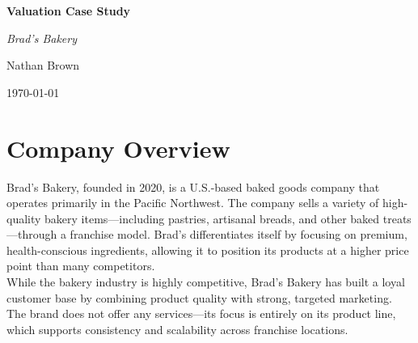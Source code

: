 \documentclass[11pt]{article}
\begin{document}
\begin{center}
    \vspace*{0.5cm}
    {\Huge\bfseries Valuation Case Study\par}
    \vspace{0.8cm}
    {\LARGE\itshape Brad's Bakery\par}
    \vspace{0.8cm}
    {\large Nathan Brown\par}
    {\large \today\par}
    \vspace{1cm}
\end{center}

\tableofcontents
\newpage

\section{Company Overview}
Brad’s Bakery, founded in 2020, is a U.S.-based baked goods company that operates primarily in the Pacific Northwest. The company sells a variety of high-quality bakery items—including pastries, artisanal breads, and other baked treats—through a franchise model. Brad’s differentiates itself by focusing on premium, health-conscious ingredients, allowing it to position its products at a higher price point than many competitors. \\

While the bakery industry is highly competitive, Brad’s Bakery has built a loyal customer base by combining product quality with strong, targeted marketing. The brand does not offer any services—its focus is entirely on its product line, which supports consistency and scalability across franchise locations.
\end{document}
